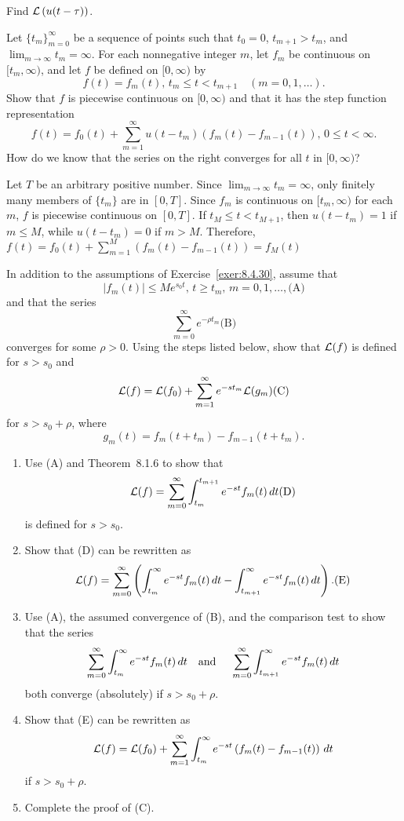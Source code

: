 \documentclass{ximera}
\begin{document}
\begin{problem}\label{exer:8.4.29} Find ${\cal L}\left(u(t-\tau)\right)$.
\end{problem}

\begin{problem}\label{exer:8.4.30}
Let $\{t_m\}_{m=0}^\infty$ be a sequence of points such that $t_0=0$,
$t_{m+1}>t_m$, and $\lim_{m\to\infty}t_m=\infty$. For each nonnegative
integer $m$, let $f_m$ be continuous on $[t_m,\infty)$, and let $f$ be
defined on $[0,\infty)$ by
$$
f(t)=f_m(t),\,t_m\le t<t_{m+1}\quad (m=0,1,\dots).
$$
Show that $f$ is piecewise continuous on $[0,\infty)$  and
that it has the step function representation
$$
f(t)=f_0(t)+\sum_{m=1}^\infty u(t-t_m)\left(f_m(t)-f_{m-1}(t)\right),\,
0\le t<\infty.
$$
How do we know that the series on the right converges for all $t$
in $[0,\infty)$?

\begin{solution}
Let $T$ be an arbitrary positive number.
Since $\lim_{m\to\infty}t_m=\infty$, only finitely many
members of  $\{t_m\}$ are in $[0,T]$.
Since $f_m$ is continuous on $[t_m,\infty)$ for each $m$,
$f$ is piecewise continuous on $[0,T]$.
If $t_M\le t<t_{M+1}$, then   $u(t-t_m)=1$ if $m\le M$, while
$u(t-t_m)=0$ if $m>M$. Therefore,
$f(t)= f_0(t)+\sum_{m=1}^M(f_m(t)-f_{m-1}(t))=f_M(t)$
\end{solution}
\end{problem}

\begin{problem}\label{exer:8.4.31}
In addition to the assumptions of Exercise~\ref{exer:8.4.30},
assume that
$$
|f_m(t)|\le Me^{s_0t},\,t\ge t_m,\,m=0,1,\dots,
\text{(A)}
$$
and that the series
$$
\sum_{m=0}^\infty e^{-\rho t_m}
\text{(B)}
$$
converges for some $\rho>0$. Using the  steps listed below, show
that
${\cal L}(f)$ is defined for $s>s_0$  and
$$
{\cal L}(f)={\cal L}(f_0)+\sum_{m=1}^\infty e^{-st_m}{\cal L}(g_m)
\text{(C)}
$$
for $s>s_0+\rho$,
where
$$
g_m(t)=f_m(t+t_m)-f_{m-1}(t+t_m).
$$

\begin{enumerate} %
\item
Use (A) and Theorem~8.1.6 to show that
$$
{\cal L}(f)=\sum_{m=0}^\infty\int_{t_m}^{t_{m+1}}e^{-st}f_m(t)\,dt
\text{(D)}
$$
is defined for $s>s_0$.
\item %
Show that  (D) can be rewritten as
$$
{\cal L}(f)=\sum_{m=0}^\infty\left(\int_{t_m}^\infty e^{-st}f_m(t)\,dt
-\int_{t_{m+1}}^\infty e^{-st}f_m(t)\,dt\right).
\text{(E)}
$$
\item %
Use  (A), the assumed convergence of  (B), and the
comparison test  to show that the series
$$
\sum_{m=0}^\infty\int_{t_m}^\infty e^{-st}f_m(t)\,dt\mbox{\quad and \quad}
\sum_{m=0}^\infty\int_{t_{m+1}}^\infty e^{-st}f_m(t)\,dt
$$
both converge (absolutely) if $s>s_0+\rho$.
\item %
Show that  (E) can be rewritten as
 $$
{\cal L}(f)={\cal L}(f_0)+\sum_{m=1}^\infty\int_{t_m}^\infty e^{-st}
\left(f_m(t)-f_{m-1}(t)\right)\,dt
$$
if $s>s_0+\rho$.
\item %
Complete the proof of  (C).
\end{enumerate}
\end{problem}
\end{document}

